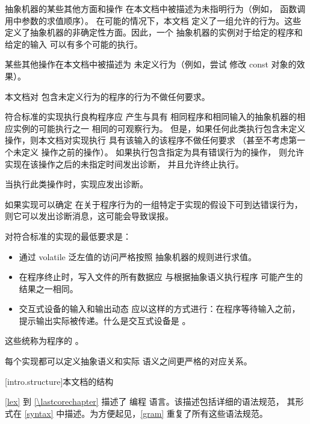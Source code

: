\pnum
{}%
抽象机器的某些其他方面和操作
在本文档中被描述为未指明行为（例如，
函数调用中参数的求值顺序）。
在可能的情况下，本文档
定义了一组允许的行为。这些
定义了抽象机器的非确定性方面。因此，一个
抽象机器的实例对于给定的程序和给定的输入
可以有多个可能的执行。

\pnum
{}%
某些其他操作在本文档中被描述为
未定义行为（例如，尝试
修改 const 对象的效果）。
\begin{note}
本文档对
包含未定义行为的程序的行为不做任何要求。
\end{note}

\pnum
{}%
%
符合标准的实现执行良构程序应
产生与具有
相同程序和相同输入的抽象机器的相应实例的可能执行之一
相同的可观察行为。
%
但是，如果任何此类执行包含未定义操作，则本文档对实现执行
具有该输入的该程序不做任何要求
（甚至不考虑第一个未定义
操作之前的操作）。
如果执行包含指定为具有错误行为的操作，
则允许实现在该操作之后的未指定时间发出诊断，
并且允许终止执行。

\pnum
\recommended
当执行此类操作时，实现应发出诊断。
\begin{note}
如果实现可以确定
在关于程序行为的一组特定于实现的假设下可到达错误行为，则它可以发出诊断消息，这可能会导致误报。

\end{note}

\pnum
{}%
对符合标准的实现的最低要求是：
\begin{itemize}
\item
通过 volatile 泛左值的访问严格按照
抽象机器的规则进行求值。
\item
在程序终止时，写入文件的所有数据应
与根据抽象语义执行程序
可能产生的结果之一相同。
\item
交互式设备的输入和输出动态
应以这样的方式进行：在程序等待输入之前，提示输出实际被传递。什么是交互式设备是
。
\end{itemize}

这些统称为程序的
。
\begin{note}
每个实现都可以定义抽象语义和实际
语义之间更严格的对应关系。
\end{note}
%

[intro.structure]{本文档的结构}

\pnum
{}%
%
\ref{lex} 到 \ref{\lastcorechapter} 描述了 \Cpp{} 编程
语言。该描述包括详细的语法规范，
其形式在 \ref{syntax} 中描述。为方便起见，\ref{gram}
重复了所有这些语法规范。

